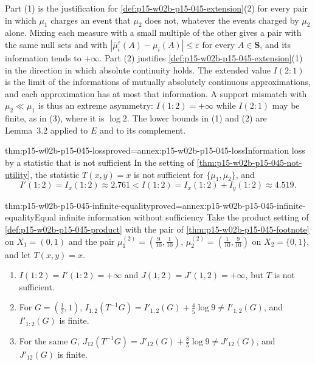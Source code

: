 Part (1) is the justification for
\cref{def:p15-w02b-p15-045-extension}(2) for every pair in which
\(\mu_1\) charges an event that \(\mu_2\) does not, whatever the events
charged by \(\mu_2\) alone. Mixing each measure with a small multiple of
the other gives a pair with the same null sets and with
\(|\bar\mu_i^\varepsilon(A)-\mu_i(A)|\leq\varepsilon\) for every
\(A\in\mathbf S\), and its information tends to \(+\infty\). Part (2) justifies
\cref{def:p15-w02b-p15-045-extension}(1) in the direction in which
absolute continuity holds. The extended value \(I(2:1)\) is the limit of
the informations of mutually absolutely continuous approximations, and
each approximation has at most that information. A support mismatch with
\(\mu_2\ll\mu_1\) is thus an extreme asymmetry: \(I(1:2)=+\infty\) while
\(I(2:1)\) may be finite, as in (3), where it is \(\log2\). The lower
bounds in (1) and (2) are Lemma~3.2 applied to \(E\) and to its
complement.

\begin{hbtheorem}{thm:p15-w02b-p15-045-loss}{proved=annex:p15-w02b-p15-045-loss}{Information loss by a statistic that is not sufficient}
In the setting of \cref{thm:p15-w02b-p15-045-not-utility}, the
statistic \(T(x,y)=x\) is not sufficient for \(\{\mu_1,\mu_2\}\), and
\[
  I'(1:2)=I_x(1:2)\approx2.761<I(1:2)=I_x(1:2)+I_y(1:2)\approx4.519 .
\]
\end{hbtheorem}

\begin{hbtheorem}{thm:p15-w02b-p15-045-infinite-equality}{proved=annex:p15-w02b-p15-045-infinite-equality}{Equal infinite information without sufficiency}
Take the product setting of \cref{def:p15-w02b-p15-045-product} with
the pair of \cref{thm:p15-w02b-p15-045-footnote} on \(X_1=(0,1)\) and the
pair \(\mu_1^{(2)}=(\tfrac9{10},\tfrac1{10})\),
\(\mu_2^{(2)}=(\tfrac1{10},\tfrac9{10})\) on \(X_2=\{0,1\}\), and let
\(T(x,y)=x\).
\begin{enumerate}
\item \(I(1:2)=I'(1:2)=+\infty\) and \(J(1,2)=J'(1,2)=+\infty\), but
\(T\) is not sufficient.
\item For \(G=(\tfrac12,1)\),
\(I_{1:2}(T^{-1}G)=I'_{1:2}(G)+\tfrac45\log9\neq I'_{1:2}(G)\), and
\(I'_{1:2}(G)\) is finite.
\item For the same \(G\),
\(J_{12}(T^{-1}G)=J'_{12}(G)+\tfrac85\log9\neq J'_{12}(G)\), and
\(J'_{12}(G)\) is finite.
\end{enumerate}
\end{hbtheorem}

